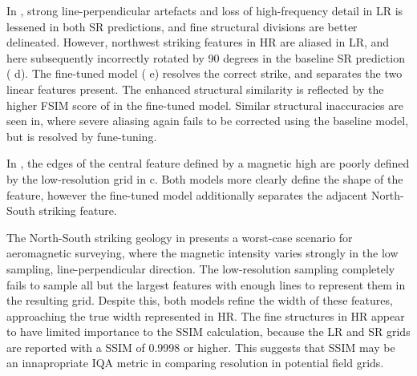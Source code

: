 In , strong line-perpendicular artefacts and loss of high-frequency detail in LR is lessened in both SR predictions, and fine structural divisions are better delineated.
However, northwest striking features in HR are aliased in LR, and here subsequently incorrectly rotated by 90 degrees in the baseline SR prediction ( d).
The fine-tuned model ( e) resolves the correct strike, and separates the two linear features present.
The enhanced structural similarity is reflected by the higher FSIM score of in the fine-tuned model. 
Similar structural inaccuracies are seen in, where severe aliasing again fails to be corrected using the baseline model, but is resolved by fune-tuning.

In , the edges of the central feature defined by a magnetic high are poorly defined by the low-resolution grid in  c.
Both models more clearly define the shape of the feature, however the fine-tuned model additionally separates the adjacent North-South striking feature.

The North-South striking geology in  presents a worst-case scenario for aeromagnetic surveying, where the magnetic intensity varies strongly in the low sampling, line-perpendicular direction.
The low-resolution sampling completely fails to sample all but the largest features with enough lines to represent them in the resulting grid.
Despite this, both models refine the width of these features, approaching the true width represented in HR\@.
The fine structures in HR appear to have limited importance to the SSIM calculation, because the LR and SR grids are reported with a SSIM of 0.9998 or higher.
This suggests that SSIM may be an innapropriate IQA metric in comparing resolution in potential field grids.

